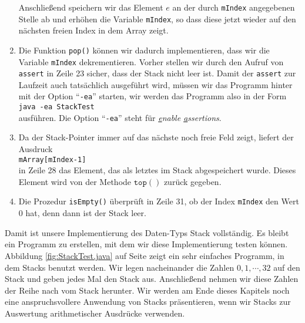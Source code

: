 \begin{enumerate}
      Anschlie{\ss}end speichern wir das Element $e$ an der durch \texttt{mIndex}
      angegebenen Stelle ab und erh\"ohen die Variable \texttt{mIndex}, so dass diese jetzt 
      wieder auf den n\"achsten freien Index in dem Array zeigt.
\item Die Funktion \texttt{pop()} k\"onnen wir dadurch implementieren, dass wir
      die Variable \texttt{mIndex} dekrementieren.  Vorher stellen wir durch den Aufruf 
      von \texttt{assert} in Zeile 23 sicher, dass der Stack nicht leer ist.
      Damit der \texttt{assert} zur Laufzeit auch tats\"achlich ausgef\"uhrt wird,
      m\"ussen wir das Programm hinter mit der Option ``\texttt{-ea}'' starten, wir werden das
      Programm also in der Form
      \\[0.2cm]
      \hspace*{1.3cm}
      \texttt{java -ea StackTest}
      \\[0.2cm]
      ausf\"uhren.  Die Option ``\texttt{-ea}'' steht f\"ur 
      \emph{\underline{e}nable \underline{a}ssertions}.
\item Da der Stack-Pointer immer auf das n\"achste noch freie Feld zeigt,
      liefert der Ausdruck \\[0.1cm]
      \hspace*{1.3cm} \texttt{mArray[mIndex-1]} \\[0.1cm]
      in Zeile 28 das Element, das als letztes im Stack abgespeichert wurde.
      Dieses Element wird von der Methode $\mathtt{top}()$ zur\"uck gegeben.
\item Die Prozedur \texttt{isEmpty()} \"uberpr\"uft in Zeile 31, ob der Index
      \texttt{mIndex} den Wert 0 hat, denn dann ist der Stack leer.
\end{enumerate}
Damit ist unsere Implementierung des Daten-Typs Stack vollst\"andig.  Es bleibt
ein Programm zu erstellen, mit dem wir diese Implementierung testen k\"onnen.
Abbildung \ref{fig:StackTest.java} auf Seite \pageref{fig:StackTest.java}
zeigt ein sehr einfaches Programm, in dem Stacks benutzt werden.  
Wir legen nacheinander die Zahlen $0, 1, \cdots, 32$
auf den Stack und geben jedes Mal den Stack aus.  Anschlie{\ss}end nehmen wir diese Zahlen der
Reihe nach vom Stack herunter.
Wir werden am Ende dieses Kapitels noch eine anspruchsvollere Anwendung von Stacks
pr\"asentieren, wenn wir Stacks zur Auswertung arithmetischer Ausdr\"ucke verwenden.


